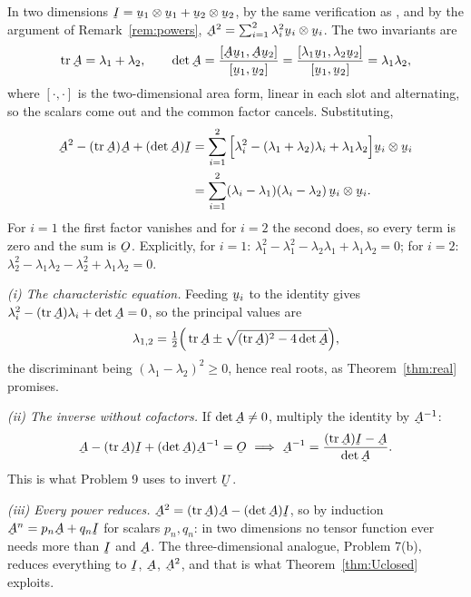 \begin{solution}
In two dimensions $\I=\bu_{1}\otimes\bu_{1}+\bu_{2}\otimes\bu_{2}$, by the
same verification as , and by the argument of
Remark~\ref{rem:powers},
$\bA^{2}=\sum_{i=1}^{2}\lambda_{i}^{2}\bu_{i}\otimes\bu_{i}$. The two
invariants are
\[
   \tr\bA=\lambda_{1}+\lambda_{2},
   \qquad
   \det\bA=\frac{[\bA\bu_{1},\bA\bu_{2}]}{[\bu_{1},\bu_{2}]}
          =\frac{[\lambda_{1}\bu_{1},\lambda_{2}\bu_{2}]}
                {[\bu_{1},\bu_{2}]}=\lambda_{1}\lambda_{2},
\]
where $[\cdot,\cdot]$ is the two-dimensional area form, linear in each
slot and alternating, so the scalars come out and the common factor
cancels. Substituting,
\[
\begin{aligned}
   \bA^{2}-(\tr\bA)\bA+(\det\bA)\I
   &=\sum_{i=1}^{2}\Big[\lambda_{i}^{2}
     -(\lambda_{1}+\lambda_{2})\lambda_{i}
     +\lambda_{1}\lambda_{2}\Big]\bu_{i}\otimes\bu_{i}\\
   &=\sum_{i=1}^{2}(\lambda_{i}-\lambda_{1})(\lambda_{i}-\lambda_{2})\,
     \bu_{i}\otimes\bu_{i}.
\end{aligned}
\]
For $i=1$ the first factor vanishes and for $i=2$ the second does, so
every term is zero and the sum is $\Ob$. Explicitly, for $i=1$:
$\lambda_{1}^{2}-\lambda_{1}^{2}-\lambda_{2}\lambda_{1}
+\lambda_{1}\lambda_{2}=0$; for $i=2$:
$\lambda_{2}^{2}-\lambda_{1}\lambda_{2}-\lambda_{2}^{2}
+\lambda_{1}\lambda_{2}=0$.
\end{solution}

\begin{remark}\label{rem:CH2d}
\emph{(i) The characteristic equation.} Feeding $\bu_{i}$ to the identity
gives $\lambda_{i}^{2}-(\tr\bA)\lambda_{i}+\det\bA=0$, so the principal
values are
\[
   \lambda_{1,2}=\tfrac12\Big(\tr\bA\pm\sqrt{(\tr\bA)^{2}-4\det\bA}\Big),
\]
the discriminant being $(\lambda_{1}-\lambda_{2})^{2}\ge0$, hence real
roots, as Theorem~\ref{thm:real} promises.

\emph{(ii) The inverse without cofactors.} If $\det\bA\neq0$, multiply the
identity by $\bA^{-1}$:
\[
   \bA-(\tr\bA)\I+(\det\bA)\bA^{-1}=\Ob
   \ \Longrightarrow\
   \bA^{-1}=\frac{(\tr\bA)\I-\bA}{\det\bA}.
\]
This is what Problem 9 uses to invert $\bU$.

\emph{(iii) Every power reduces.} $\bA^{2}=(\tr\bA)\bA-(\det\bA)\I$, so by
induction $\bA^{n}=p_{n}\bA+q_{n}\I$ for scalars $p_{n},q_{n}$: in two
dimensions no tensor function ever needs more than $\I$ and $\bA$. The
three-dimensional analogue, Problem 7(b), reduces everything to $\I$,
$\bA$, $\bA^{2}$, and that is what Theorem~\ref{thm:Uclosed} exploits.
\end{remark}

